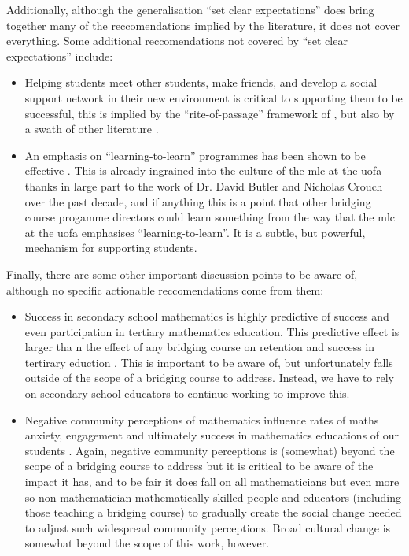 \documentclass[twoside,12pt,a4paper]{report}
\begin{document}
Additionally, although the generalisation ``set clear expectations'' does bring together many of the reccomendations implied by the literature, it does not cover everything. Some additional reccomendations not covered by ``set clear expectations'' include:
\begin{itemize}
	\item Helping students meet other students, make friends, and develop a social support network in their new environment is critical to supporting them to be successful, this is implied by the ``rite-of-passage'' framework of \cite{Clark2008}, but also by a swath of other literature \cite{Trotter2006, Peat2001, Leese2010, Gordon2013}.
	\item An emphasis on ``learning-to-learn'' programmes has been shown to be effective \cite{Zeegers2001}. This is already ingrained into the culture of the \gls{mlc} at the \gls{uofa} thanks in large part to the work of Dr. David Butler and Nicholas Crouch over the past decade, and if anything this is a point that other bridging course progamme directors could learn something from the way that the \gls{mlc} at the \gls{uofa} emphasises ``learning-to-learn''. It is a subtle, but powerful, mechanism for supporting students.
\end{itemize}


Finally, there are some other important discussion points to be aware of, although no specific actionable reccomendations come from them:
\begin{itemize}
	\item Success in secondary school mathematics is highly predictive of success and even participation in tertiary mathematics education. This predictive effect is larger tha n the effect of any bridging course on retention and success in tertirary eduction \cite{Kajander2005, Nicholas2015b}. This is important to be aware of, but unfortunately falls outside of the scope of a bridging course to address. Instead, we have to rely on secondary school educators to continue working to improve this.
	\item Negative community perceptions of mathematics influence rates of maths anxiety, engagement and ultimately success in mathematics educations of our students \cite{King2015, Gordon2013, Clark2008}. Again, negative community perceptions is (somewhat) beyond the scope of a bridging course to address but it is critical to be aware of the impact it has, and to be fair it does fall on all mathematicians but even more so non-mathematician mathematically skilled people and educators (including those teaching a bridging course) to gradually create the social change needed to adjust such widespread community perceptions. Broad cultural change is somewhat beyond the scope of this work, however.
\end{itemize}
\end{document}
